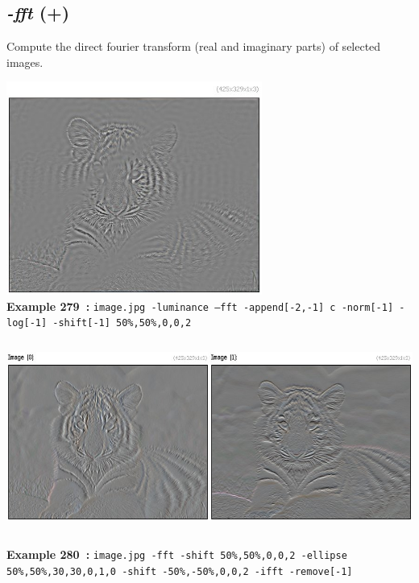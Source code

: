 \documentclass[a4paper,11pt,twoside]{book}
\begin{document}
\subsection{\emph{-fft} (+)}\vspace*{-0.5em}
Compute the direct fourier transform (real and imaginary parts) of selected images.
\begin{center}\includegraphics[keepaspectratio=true,height=7cm,width=\textwidth]{img/gmic_def279.jpg}\\
{\footnotesize \textbf{Example 279~:} \texttt{image.jpg -luminance --fft -append[-2,-1] c -norm[-1] -log[-1] -shift[-1] 50\%,50\%,0,0,2}}
\\\includegraphics[keepaspectratio=true,height=7cm,width=\textwidth]{img/gmic_def280.jpg}\\
{\footnotesize \textbf{Example 280~:} \texttt{image.jpg -fft -shift 50\%,50\%,0,0,2 -ellipse 50\%,50\%,30,30,0,1,0 -shift -50\%,-50\%,0,0,2 -ifft -remove[-1]}}
\end{center}
\end{document}

